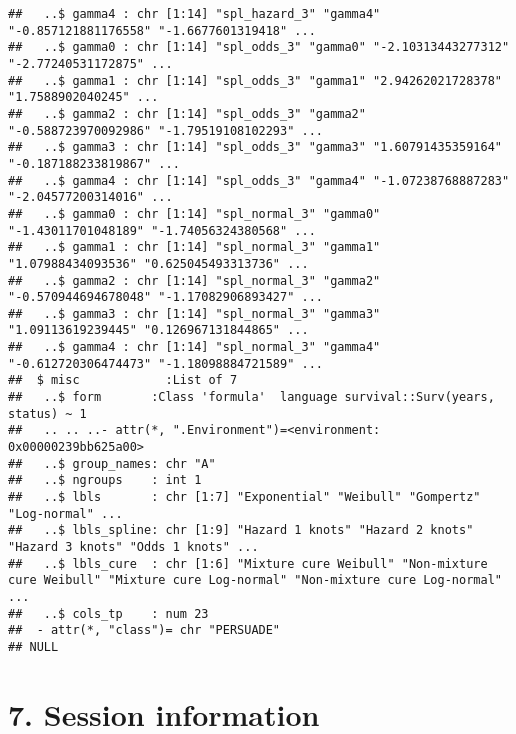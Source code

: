 \documentclass[
]{article}
\begin{document}
\begin{verbatim}
##   ..$ gamma4 : chr [1:14] "spl_hazard_3" "gamma4" "-0.857121881176558" "-1.6677601319418" ...
##   ..$ gamma0 : chr [1:14] "spl_odds_3" "gamma0" "-2.10313443277312" "-2.77240531172875" ...
##   ..$ gamma1 : chr [1:14] "spl_odds_3" "gamma1" "2.94262021728378" "1.7588902040245" ...
##   ..$ gamma2 : chr [1:14] "spl_odds_3" "gamma2" "-0.588723970092986" "-1.79519108102293" ...
##   ..$ gamma3 : chr [1:14] "spl_odds_3" "gamma3" "1.60791435359164" "-0.187188233819867" ...
##   ..$ gamma4 : chr [1:14] "spl_odds_3" "gamma4" "-1.07238768887283" "-2.04577200314016" ...
##   ..$ gamma0 : chr [1:14] "spl_normal_3" "gamma0" "-1.43011701048189" "-1.74056324380568" ...
##   ..$ gamma1 : chr [1:14] "spl_normal_3" "gamma1" "1.07988434093536" "0.625045493313736" ...
##   ..$ gamma2 : chr [1:14] "spl_normal_3" "gamma2" "-0.570944694678048" "-1.17082906893427" ...
##   ..$ gamma3 : chr [1:14] "spl_normal_3" "gamma3" "1.09113619239445" "0.126967131844865" ...
##   ..$ gamma4 : chr [1:14] "spl_normal_3" "gamma4" "-0.612720306474473" "-1.18098884721589" ...
##  $ misc            :List of 7
##   ..$ form       :Class 'formula'  language survival::Surv(years, status) ~ 1
##   .. .. ..- attr(*, ".Environment")=<environment: 0x00000239bb625a00> 
##   ..$ group_names: chr "A"
##   ..$ ngroups    : int 1
##   ..$ lbls       : chr [1:7] "Exponential" "Weibull" "Gompertz" "Log-normal" ...
##   ..$ lbls_spline: chr [1:9] "Hazard 1 knots" "Hazard 2 knots" "Hazard 3 knots" "Odds 1 knots" ...
##   ..$ lbls_cure  : chr [1:6] "Mixture cure Weibull" "Non-mixture cure Weibull" "Mixture cure Log-normal" "Non-mixture cure Log-normal" ...
##   ..$ cols_tp    : num 23
##  - attr(*, "class")= chr "PERSUADE"
## NULL
\end{verbatim}

\clearpage

\section{7. Session information}\label{session-information}
\end{document}
